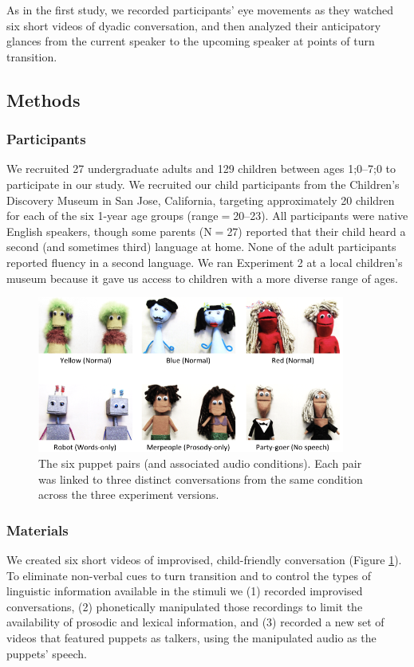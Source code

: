 \documentclass[authoryear, 12pt]{elsarticle}
\begin{document}
As in the first study, we recorded participants' eye movements as they watched six short videos of dyadic conversation, and then analyzed their anticipatory glances from the current speaker to the upcoming speaker at points of turn transition.

\subsection{Methods}
\label{sec:methods2}

\subsubsection{Participants}
We recruited 27 undergraduate adults and 129 children between ages 1;0--7;0 to participate in our study. We recruited our child participants from the Children's Discovery Museum in San Jose, California, targeting approximately 20 children for each of the six 1-year age groups (range$=$20--23). All participants were native English speakers, though some parents (N$=$27) reported that their child heard a second (and sometimes third) language at home. None of the adult participants reported fluency in a second language. We ran Experiment 2 at a local children's museum because it gave us access to children with a more diverse range of ages.

\begin{figure}[t]
\begin{center}
\includegraphics[width=0.9\textwidth]{figures/FIG-EN-stim.png}
\end{center}
\caption{The six puppet pairs (and associated audio conditions). Each pair was linked to three distinct conversations from the same condition across the three experiment versions.}
\label{fig:puppets}
\end{figure}

\subsubsection{Materials}
We created six short videos of improvised, child-friendly conversation (Figure \ref{fig:puppets}). To eliminate non-verbal cues to turn transition and to control the types of linguistic information available in the stimuli we (1) recorded improvised conversations, (2) phonetically manipulated those recordings to limit the availability of prosodic and lexical information, and (3) recorded a new set of videos that featured puppets as talkers, using the manipulated audio as the puppets' speech. 
\end{document}
